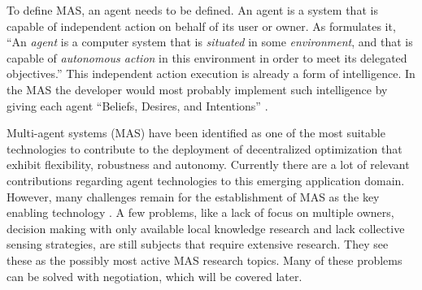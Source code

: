 To define MAS, an agent needs to be defined. An agent is a system that is capable of independent action on behalf of its user or owner. As  \citet{wooldridge2009introduction} formulates it, ``An \textit{agent} is a computer system that is \textit{situated} in some \textit{environment}, and that is capable of \textit{autonomous action} in this environment in order to meet its delegated objectives.'' This independent action execution is already a form of intelligence\citep{wooldridge2009introduction}. In the MAS the developer would most probably implement such intelligence by giving each agent ``Beliefs, Desires, and Intentions'' \citep{rao1995bdi}.  

Multi-agent systems (MAS) have been identified as one of the most suitable technologies to contribute to the deployment of decentralized optimization that exhibit flexibility, robustness and autonomy\citep{vinyals2010survey}. Currently there are a lot of relevant contributions regarding agent technologies to this emerging application domain. However, many challenges remain for the establishment of MAS as the key enabling technology \citep{vinyals2010survey}. A few problems, like a lack of focus on multiple owners, decision making with only available local knowledge research and lack collective sensing strategies, are still subjects that require extensive research. They see these as the possibly most active MAS research topics. Many of these problems can be solved with negotiation, which will be covered later.

